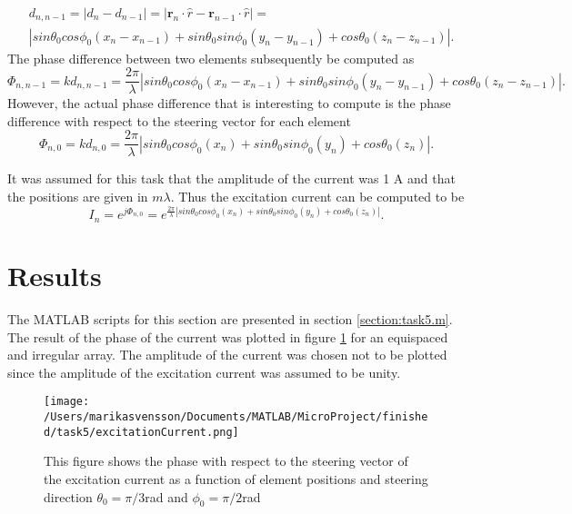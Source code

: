 \begin{align}
& d_{n,n-1} = |d_n-d_{n-1}| = |\mathbf{r}_n \cdot \hat{r} -\mathbf{r}_{n-1} \cdot \hat{r}| =\\
& | sin\theta_0 cos\phi_0 (x_n -x_{n-1}) + sin\theta_0 sin\phi_0 (y_n -y_{n-1})  + cos\theta_0 (z_n -z_{n-1}) |.
\end{align}
The phase difference  between two elements subsequently  be computed as 
\begin{equation}
\Phi_{n, n-1} = kd_{n,n-1} = \frac{2\pi}{\lambda} | sin\theta_0 cos\phi_0 (x_n -x_{n-1}) + sin\theta_0 sin\phi_0 (y_n -y_{n-1})  + cos\theta_0 (z_n -z_{n-1}) |. 
\end{equation}
However, the actual phase difference that is interesting to compute is the phase difference with respect to the steering vector for each element
\begin{equation}
\Phi_{n, 0} = kd_{n,0} = \frac{2\pi}{\lambda} | sin\theta_0 cos\phi_0 (x_n) + sin\theta_0 sin\phi_0 (y_n)  + cos\theta_0 (z_n)|. 
\end{equation}

It was assumed for this task that the amplitude of the current was 1 A and that the positions are given in $ m \lambda$. Thus the excitation current can be computed to be 
\begin{equation}
I_n = e^{j\Phi_{n, 0}} =e^{ \frac{2\pi}{\lambda} | sin\theta_0 cos\phi_0 (x_n) + sin\theta_0 sin\phi_0 (y_n)  + cos\theta_0 (z_n)| }.
\end{equation}\cite{kildal2000foundations}


\section{Results}
The MATLAB scripts for this section are presented in section \ref{section:task5.m}. The result of the phase of the current was plotted in figure \ref{task5:phase} for an equispaced and irregular array. The amplitude of the current was chosen not to be plotted since the amplitude of the excitation current was assumed to be unity.

\begin{figure}[h]
\centering
\texttt{[image: /Users/marikasvensson/Documents/MATLAB/MicroProject/finished/task5/excitationCurrent.png]}
\caption{This figure shows the phase with respect to the steering vector of the excitation current as a function of element positions and steering direction $\theta_0 = \pi/3$rad and $\phi_0 = \pi/2$rad }
\label{task5:phase}
\end{figure}

